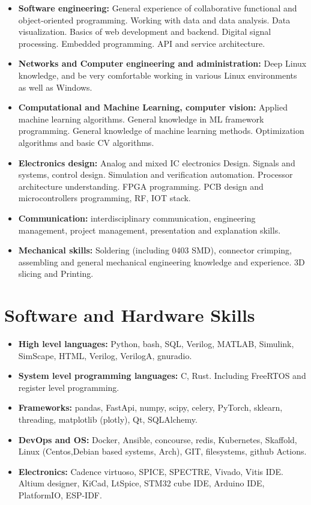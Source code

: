 \documentclass{article}
\begin{document}
\begin{itemize}

   \item \textbf{Software engineering:} General experience of collaborative functional and object-oriented programming. Working with data and data analysis. Data visualization. Basics of web development and backend. Digital signal processing. Embedded programming. API and service architecture.
   \item \textbf{Networks and Computer engineering and administration:} Deep Linux knowledge, and be very comfortable working in various Linux environments as well as Windows.
   \item \textbf{Computational and Machine Learning, computer vision:} Applied machine learning algorithms. General knowledge in ML framework programming. General knowledge of machine learning methods. Optimization algorithms and basic CV algorithms.
   \item \textbf{Electronics design:} Analog and mixed IC electronics Design. Signals and systems, control design. Simulation and verification automation. Processor architecture understanding. FPGA programming. PCB design and microcontrollers programming, RF, IOT stack.
   \item \textbf{Communication:} interdisciplinary communication, engineering management, project management, presentation and explanation skills.
   \item \textbf{Mechanical skills:} Soldering (including 0403 SMD), connector crimping,  assembling and general mechanical engineering knowledge and experience. 3D slicing and Printing.
\end{itemize}

\section{Software and Hardware Skills}

\begin{itemize}

   \item \textbf{High level languages:} Python, bash, SQL, Verilog, MATLAB, Simulink, SimScape, HTML, Verilog, VerilogA, gnuradio.
   \item \textbf{System level programming languages:} C, Rust. Including FreeRTOS and register level programming.
   \item \textbf{Frameworks:} pandas, FastApi, numpy, scipy, celery, PyTorch, sklearn, threading, matplotlib (plotly), Qt, SQLAlchemy.
   \item \textbf{DevOps and OS:} Docker, Ansible, concourse, redis, Kubernetes, Skaffold, Linux (Centos,Debian based systems, Arch), GIT, filesystems, github Actions.
   \item \textbf{Electronics:} Cadence virtuoso, SPICE, SPECTRE, Vivado, Vitis IDE. Altium designer, KiCad, LtSpice, STM32 cube IDE, Arduino IDE, PlatformIO, ESP-IDF.

\end{itemize}
\end{document}
